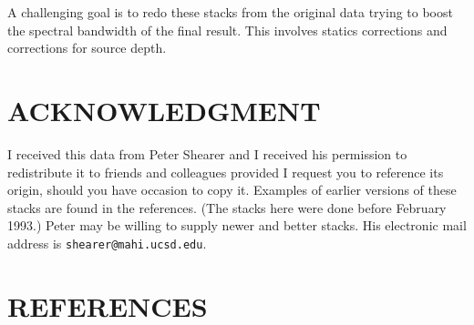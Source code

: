 A challenging goal is to redo these stacks from the original data
trying to boost the spectral bandwidth of the final result.
This involves statics corrections and corrections for source depth.


\section{ACKNOWLEDGMENT}
I received this data from Peter Shearer
and I received his permission to redistribute it to friends and colleagues
provided I request you to reference its origin,
should you have occasion to copy it.
Examples of earlier versions of these stacks are found in the references.
(The stacks here were done before February 1993.)
Peter may be willing to supply newer and better stacks.
His electronic mail address is {\tt shearer@mahi.ucsd.edu}.


%

\section{REFERENCES}


